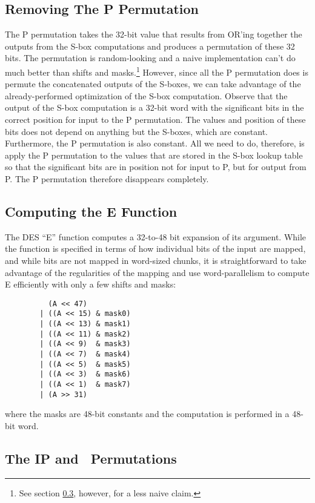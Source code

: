 \subsection{Removing The P Permutation}

The P permutation takes the 32-bit value that results from OR'ing
together the outputs from the S-box computations and produces a
permutation of these 32 bits.  The permutation is random-looking and a
naive implementation can't do much better than shifts and
masks.\footnote{See section \ref{sec:IP-perm}, however, for a less naive
claim.} However, since all the P permutation does is permute the
concatenated outputs of the S-boxes, we can take advantage of the
already-performed optimization of the S-box computation.  Observe that
the output of the S-box computation is a 32-bit word with the
significant bits in the correct position for input to the P permutation.
The values and position of these bits does not depend on anything but
the S-boxes, which are constant.  Furthermore, the P permutation is also
constant.  All we need to do, therefore, is apply the P permutation to
the values that are stored in the S-box lookup table so that the
significant bits are in position not for input to P, but for output from
P.  The P permutation therefore disappears completely.


\subsection{Computing the E Function}

The DES ``E'' function computes a 32-to-48 bit expansion of its
argument.  While the function is specified in terms of how individual
bits of the input are mapped, and while bits are not mapped in
word-sized chunks, it is straightforward to take advantage of the
regularities of the mapping and use word-parallelism to compute E
efficiently with only a few shifts and masks:
\begin{verbatim}
          (A << 47)
        | ((A << 15) & mask0)
        | ((A << 13) & mask1)
        | ((A << 11) & mask2)
        | ((A << 9)  & mask3)
        | ((A << 7)  & mask4)
        | ((A << 5)  & mask5)
        | ((A << 3)  & mask6)
        | ((A << 1)  & mask7)
        | (A >> 31)
\end{verbatim}
where the masks are 48-bit constants and the computation is performed in
a 48-bit word.

\subsection{The IP and \ipinv\ Permutations}
\label{sec:IP-perm}

